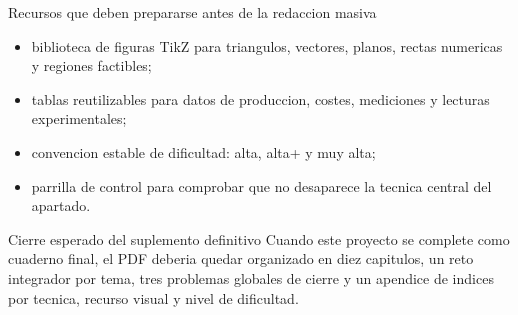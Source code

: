 \begin{databox}{Recursos que deben prepararse antes de la redaccion masiva}
\begin{itemize}
  \item biblioteca de figuras TikZ para triangulos, vectores, planos, rectas numericas y
  regiones factibles;
  \item tablas reutilizables para datos de produccion, costes, mediciones y lecturas
  experimentales;
  \item convencion estable de dificultad: alta, alta+ y muy alta;
  \item parrilla de control para comprobar que no desaparece la tecnica central del apartado.
\end{itemize}
\end{databox}

\begin{planningbox}{Cierre esperado del suplemento definitivo}
Cuando este proyecto se complete como cuaderno final, el PDF deberia quedar organizado en diez
capitulos, un reto integrador por tema, tres problemas globales de cierre y un apendice de
indices por tecnica, recurso visual y nivel de dificultad.
\end{planningbox}
